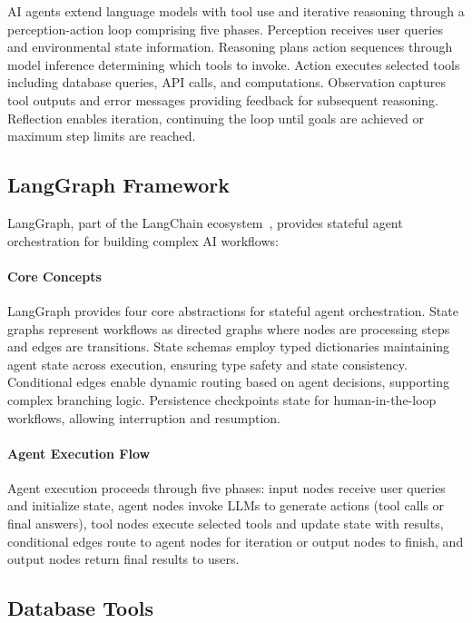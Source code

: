 AI agents extend language models with tool use and iterative reasoning through a perception-action loop comprising five phases. Perception receives user queries and environmental state information. Reasoning plans action sequences through model inference determining which tools to invoke. Action executes selected tools including database queries, API calls, and computations. Observation captures tool outputs and error messages providing feedback for subsequent reasoning. Reflection enables iteration, continuing the loop until goals are achieved or maximum step limits are reached.

\subsection{LangGraph Framework}

LangGraph, part of the LangChain ecosystem~\cite{chase2022langchain}, provides stateful agent orchestration for building complex AI workflows:

\paragraph{Core Concepts}

LangGraph provides four core abstractions for stateful agent orchestration. State graphs represent workflows as directed graphs where nodes are processing steps and edges are transitions. State schemas employ typed dictionaries maintaining agent state across execution, ensuring type safety and state consistency. Conditional edges enable dynamic routing based on agent decisions, supporting complex branching logic. Persistence checkpoints state for human-in-the-loop workflows, allowing interruption and resumption.

\paragraph{Agent Execution Flow}

Agent execution proceeds through five phases: input nodes receive user queries and initialize state, agent nodes invoke LLMs to generate actions (tool calls or final answers), tool nodes execute selected tools and update state with results, conditional edges route to agent nodes for iteration or output nodes to finish, and output nodes return final results to users.

\subsection{Database Tools}

